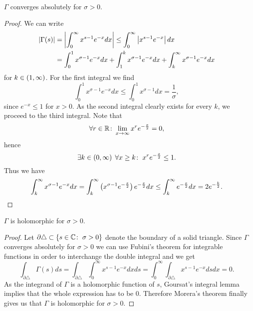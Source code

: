 \begin{theorem}
	$\Gamma$ converges absolutely for $\sigma > 0$.
\end{theorem}
\begin{proof}
	We can write
\begin{equation*}
\begin{aligned}
	\left|\Gamma(s)\right|
	&= \left|\int _0 ^\infty x^{s - 1} e^{-x} dx\right| \leq \int _0 ^\infty \left|x^{s - 1} e^{-x}\right| dx \\
	&= \int _0 ^1 x^{\sigma - 1} e^{-x} dx + \int _1 ^k x^{\sigma - 1} e^{-x} dx + \int _k ^\infty x^{\sigma - 1} e^{-x} dx
\end{aligned}
\end{equation*}
	for $k \in \left(1, \infty\right)$. For the first integral we find
\begin{equation*}
	\int _0 ^1 x^{\sigma - 1} e^{-x} dx \leq \int _0 ^1 x^{\sigma - 1} dx = \frac{1}{\sigma},
\end{equation*}
	since $e^{-x} \leq 1$ for $x > 0$. As the second integral clearly exists for every $k$, we proceed to the third integral. Note that
\begin{equation*}
	\forall r \in \mathbb{R} \colon \lim\limits_{x \to \infty} x^r e^{-\frac{x}{2}} = 0,
\end{equation*}
 	hence
\begin{equation*}
	\exists k \in \left(0, \infty\right) \; \forall x \geq k \colon \; x^r e^{-\frac{x}{2}} \leq 1.
\end{equation*}
	Thus we have
\begin{equation*}
	\int _k ^\infty x^{\sigma - 1} e^{-x} dx = \int _k ^\infty \left(x^{\sigma - 1} e^{-\frac{x}{2}}\right) e^{-\frac{x}{2}} dx \leq \int _k ^\infty e^{-\frac{x}{2}} dx = 2 e^{-\frac{k}{2}}.
\end{equation*}
\end{proof}


\begin{theorem}
	$\Gamma$ is holomorphic for $\sigma > 0$.
\end{theorem}
\begin{proof}
	Let $\partial \triangle \subset \{ s \in \mathbb{C} \colon \; \sigma > 0 \}$ denote the boundary of a solid triangle. Since $\Gamma$ converges absolutely for $\sigma > 0$ we can use Fubini's theorem for integrable functions in order to interchange the double integral and we get
\begin{equation*}
	\int _{\partial \triangle} \Gamma(s) ds = \int _{\partial \triangle} \int _0 ^\infty x^{s - 1} e^{-x} dx ds = \int _0 ^\infty \int _{\partial \triangle} x^{s - 1} e^{-x} ds dx = 0.
\end{equation*}
	As the integrand of $\Gamma$ is a holomorphic function of $s$, Goursat's integral lemma implies that the whole expression has to be $0$. Therefore Morera's theorem finally gives us that $\Gamma$ is holomorphic for $\sigma > 0$.
\end{proof}



